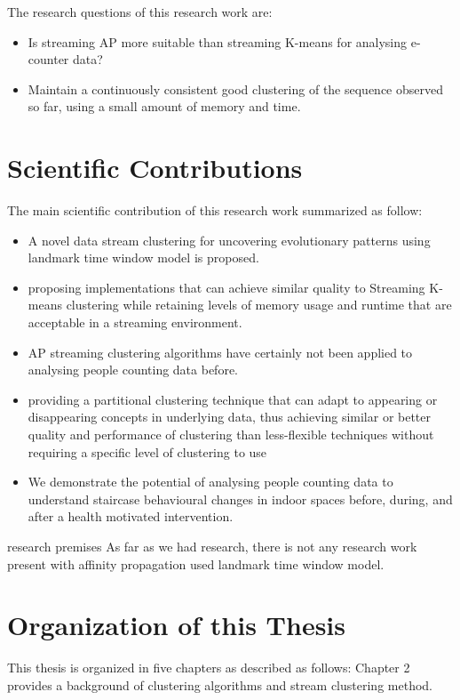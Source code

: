 The research questions of this research work are: 
\begin{itemize}
    \item Is streaming AP more suitable than streaming K-means for analysing e-counter data? 
    \item Maintain a continuously consistent good clustering of the sequence observed so far, using a small amount of memory and time.

\end{itemize}


\section{Scientific Contributions}


The main scientific contribution of this research work summarized as follow:

\begin{itemize}
    \item A novel data stream clustering for uncovering evolutionary patterns using landmark time window model is proposed. 
    \item proposing implementations that can achieve similar quality to  Streaming K-means clustering while retaining levels of memory usage and runtime that are acceptable in a streaming environment.
    \item AP streaming clustering algorithms have certainly not been applied to analysing people counting data before.
    \item  providing a partitional clustering technique that can adapt to appearing or disappearing concepts in underlying data, thus achieving similar or better quality and performance of clustering than less-flexible techniques without requiring a specific level of clustering to use
    \item We demonstrate the potential of analysing people counting data to understand staircase behavioural changes in indoor spaces before, during, and after a health motivated intervention.
\end{itemize}


\todo[inline]{}research premises 
As far as we had research, there is not any research work present with affinity propagation used landmark time window model.


\section{Organization of this Thesis}
This thesis is organized in five chapters as described as follows:
Chapter 2 provides a background of clustering algorithms and stream clustering method. 

